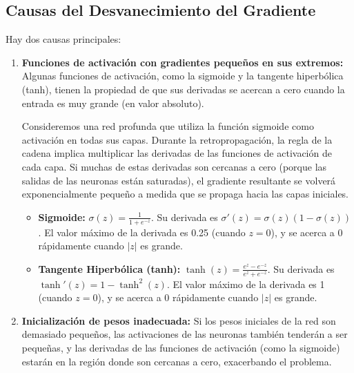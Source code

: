 \documentclass{article}
\begin{document}
\subsection{Causas del Desvanecimiento del Gradiente}

Hay dos causas principales:

\begin{enumerate}
    \item \textbf{Funciones de activación con gradientes pequeños en sus extremos:} Algunas funciones de activación, como la sigmoide y la tangente hiperbólica (tanh), tienen la propiedad de que sus derivadas se acercan a cero cuando la entrada es muy grande (en valor absoluto).
    
    Consideremos una red profunda que utiliza la función sigmoide como activación en todas sus capas. Durante la retropropagación, la regla de la cadena implica multiplicar las derivadas de las funciones de activación de cada capa. Si muchas de estas derivadas son cercanas a cero (porque las salidas de las neuronas están saturadas), el gradiente resultante se volverá exponencialmente pequeño a medida que se propaga hacia las capas iniciales.
    
    \begin{itemize}
        \item \textbf{Sigmoide:} \(\sigma(z) = \frac{1}{1 + e^{-z}}\).  Su derivada es \(\sigma'(z) = \sigma(z)(1 - \sigma(z))\).  El valor máximo de la derivada es 0.25 (cuando \(z = 0\)), y se acerca a 0 rápidamente cuando \(|z|\) es grande.

        \item \textbf{Tangente Hiperbólica (tanh):}  \(\tanh(z) = \frac{e^{z} - e^{-z}}{e^{z} + e^{-z}}\). Su derivada es \(\tanh'(z) = 1 - \tanh^2(z)\). El valor máximo de la derivada es 1 (cuando \(z = 0\)), y se acerca a 0 rápidamente cuando \(|z|\) es grande.
    \end{itemize}

    \item \textbf{Inicialización de pesos inadecuada:} Si los pesos iniciales de la red son demasiado pequeños, las activaciones de las neuronas también tenderán a ser pequeñas, y las derivadas de las funciones de activación (como la sigmoide) estarán en la región donde son cercanas a cero, exacerbando el problema.

\end{enumerate}
\end{document}
